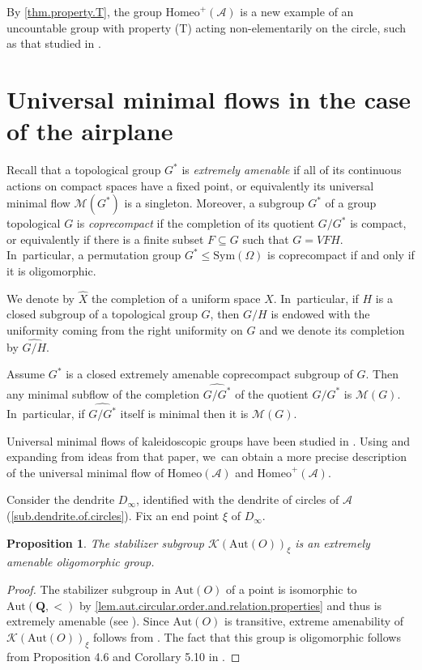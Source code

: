 \documentclass[JEP,XML,SOM,Unicode,NoFloatCountersInSection,published]{cedram}
\theoremstyle{plain}
\newtheorem{proposition}[theorem]{Proposition}
\theoremstyle{definition}
\theoremstyle{remark}
\newcommand{\Aut}{\mathrm{Aut}}
\newcommand{\Sym}{\mathrm{Sym}}
\newcommand{\Homeo}{\mathrm{Homeo}}
\newcommand{\A}{\mathcal{A}}
\newcommand{\K}{\mathcal{K}}
\begin{document}
By \cref{thm.property.T}, the group $\Homeo^+(\A)$ is a new example of an uncountable group with property (T) acting non-elementarily on the circle, such as that studied in \cite{KaleidoscopicOnCircle}.

\section{Universal minimal flows in the case of the airplane}
\label{sec.universal.minimal.flows}

Recall that a topological group $G^*$ is \emph{extremely amenable} if all of its continuous actions on compact spaces have a fixed point, or equivalently its universal minimal flow $\mathcal{M}(G^*)$ is a singleton.
Moreover, a subgroup $G^*$ of a group topological $G$ is \emph{coprecompact} if the completion of its quotient $G/G^*$ is compact, or equivalently if there is a finite subset $F \subseteq G$ such that $G = VFH$. In~particular, a permutation group $G^* \leq \Sym(\Omega)$ is coprecompact if and only if it is oligomorphic.

We denote by $\widehat{X}$ the completion of a uniform space $X$. In~particular, if $H$ is a closed subgroup of a topological group $G$, then $G/H$ is endowed with the uniformity coming from the right uniformity on $G$ and we denote its completion by $\widehat{G/H}$.

Assume $G^*$ is a closed extremely amenable coprecompact subgroup of $G$.
Then any minimal subflow of the completion $\widehat{G / G^*}$ of the quotient $G/G^*$ is $\mathcal{M}(G)$. In~particular, if $\widehat{G / G^*}$ itself is minimal then it is $\mathcal{M}(G)$.

Universal minimal flows of kaleidoscopic groups have been studied in \cite{Kaleidoscopic2}.
Using and expanding from ideas from that paper, we~can obtain a more precise description of the universal minimal flow of $\Homeo(\A)$ and $\Homeo^+(\A)$.

Consider the dendrite $D_\infty$, identified with the dendrite of circles of $\A$ (\cref{sub.dendrite.of.circles}).
Fix an end point $\xi$ of $D_\infty$.

\begin{proposition}
The stabilizer subgroup $\K(\Aut(O))_\xi$ is an extremely amenable oligomorphic group.
\end{proposition}

\begin{proof}
The stabilizer subgroup in $\Aut(O)$ of a point is isomorphic to $\Aut(\mathbf{Q},<)$ by \cref{lem.aut.circular.order.and.relation.properties} and thus is extremely amenable (see \cite{MR1608494}).
Since $\Aut(O)$ is transitive, extreme amenability of $\K(\Aut(O))_\xi$ follows from \cite[Cor.\,8.3(i)]{Kaleidoscopic2}.
The fact that this group is oligomorphic follows from Proposition 4.6 and Corollary 5.10 in \cite{Kaleidoscopic2}.
\end{proof}
\end{document}
